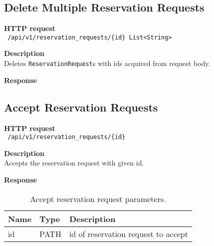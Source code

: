 \subsection{Delete Multiple Reservation Requests}
\begin{description}
    \item \textbf{HTTP request}\\
        \texttt{\text{[DELETE]} /api/v1/reservation\_requests/\{id\} \texttt{List<String>}}
    \item \textbf{Description}\\
        Deletes \texttt{ReservationRequest}s with ids acquired from request body.
    \item \textbf{Response}\\
        \texttt{\text{[200 OK]}}
\end{description}

\subsection{Accept Reservation Requests}
\begin{description}
    \item \textbf{HTTP request}\\
        \texttt{\text{[POST]} /api/v1/reservation\_requests/\{id\}}
    \item \textbf{Description}\\
        Accepts the reservation request with given id.
    \item \textbf{Response}\\
        \texttt{\text{[200 OK]}}
\end{description}
\begin{table}[ht!]
    \begin{tabularx}{\textwidth}{llX}
        \toprule
        Name & Type & Description \\
        \midrule
        id & PATH & id of reservation request to accept \\
        \bottomrule
        \end{tabularx}
    \caption{Accept reservation request parameters.}
\end{table}

